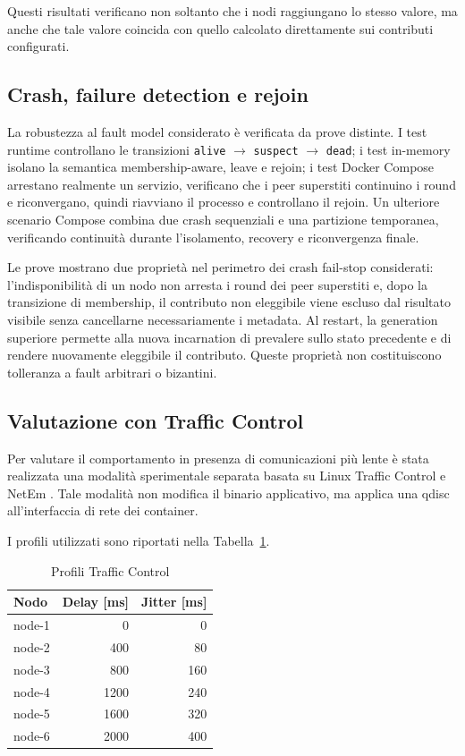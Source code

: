 \documentclass[conference]{IEEEtran}
\begin{document}
Questi risultati verificano non soltanto che i nodi raggiungano lo stesso valore, ma anche che tale valore coincida con quello calcolato direttamente sui contributi configurati.

\subsection{Crash, failure detection e rejoin}

La robustezza al fault model considerato è verificata da prove distinte. I test runtime controllano le transizioni \texttt{alive} $\rightarrow$ \texttt{suspect} $\rightarrow$ \texttt{dead}; i test in-memory isolano la semantica membership-aware, leave e rejoin; i test Docker Compose arrestano realmente un servizio, verificano che i peer superstiti continuino i round e riconvergano, quindi riavviano il processo e controllano il rejoin. Un ulteriore scenario Compose combina due crash sequenziali e una partizione temporanea, verificando continuità durante l'isolamento, recovery e riconvergenza finale.

Le prove mostrano due proprietà nel perimetro dei crash fail-stop considerati: l'indisponibilità di un nodo non arresta i round dei peer superstiti e, dopo la transizione di membership, il contributo non eleggibile viene escluso dal risultato visibile senza cancellarne necessariamente i metadata. Al restart, la generation superiore permette alla nuova incarnation di prevalere sullo stato precedente e di rendere nuovamente eleggibile il contributo. Queste proprietà non costituiscono tolleranza a fault arbitrari o bizantini.

\subsection{Valutazione con Traffic Control}

Per valutare il comportamento in presenza di comunicazioni più lente è stata realizzata una modalità sperimentale separata basata su Linux Traffic Control e NetEm \cite{netem}. Tale modalità non modifica il binario applicativo, ma applica una qdisc all'interfaccia di rete dei container.

I profili utilizzati sono riportati nella Tabella~\ref{tab:tc}.

\begin{table}[t]
\centering
\caption{Profili Traffic Control}
\label{tab:tc}
\footnotesize
\begin{tabular}{@{}lrr@{}}
\toprule
\textbf{Nodo} & \textbf{Delay [ms]} & \textbf{Jitter [ms]} \\
\midrule
node-1 & 0    & 0   \\
node-2 & 400  & 80  \\
node-3 & 800  & 160 \\
node-4 & 1200 & 240 \\
node-5 & 1600 & 320 \\
node-6 & 2000 & 400 \\
\bottomrule
\end{tabular}
\end{table}
\end{document}

